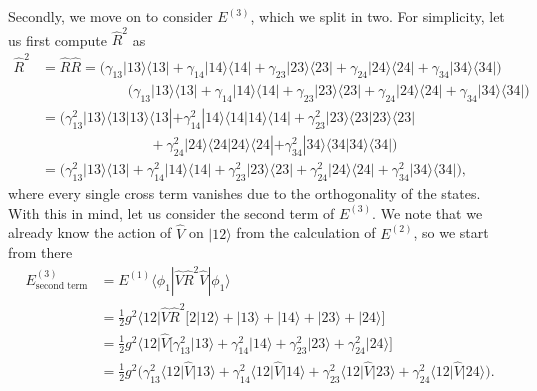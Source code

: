 \documentclass[a4paper]{article}
\newcommand{\nn}{\nonumber}
\begin{document}
Secondly, we move on to consider $E^{(3)}$, which we split in two. For simplicity, let us first compute $\hat R^2$ as
\begin{align}
\hat R^2 &= \hat R \hat R = \Big( \gamma_{13} |13\rangle\langle 13| + \gamma_{14} |14\rangle\langle 14| + \gamma_{23} |23\rangle\langle 23| + \gamma_{24} |24\rangle\langle 24| + \gamma_{34} |34\rangle\langle 34|  \Big) \nn\\
& \ \ \ \ \ \ \ \ \ \ \ \ \ \ \ \ \ \ \ \ \ \ \ \ \ \ \ \ \Big( \gamma_{13} |13\rangle\langle 13| + \gamma_{14} |14\rangle\langle 14| + \gamma_{23} |23\rangle\langle 23| + \gamma_{24} |24\rangle\langle 24| + \gamma_{34} |34\rangle\langle 34|  \Big) \nn\\
%
&= \Big( \gamma_{13}^2 |13\rangle\langle 13|13\rangle\langle 13| + \gamma_{14}^2 |14\rangle\langle 14|14\rangle\langle 14| + \gamma_{23}^2 |23\rangle\langle 23|23\rangle\langle 23| \nn\\
& \ \ \ \ \ \ \ \ \ \ \ \ \ \ \ \ \ \ \ \ \  \ \ \ \ \ \ \ \ \ \ \ \ \ \ +  \gamma_{24}^2 |24\rangle\langle 24|24\rangle\langle 24| + \gamma_{34}^2 |34\rangle\langle 34|34\rangle\langle 34|  \Big) \nn\\
%
&= \Big( \gamma_{13}^2 |13\rangle\langle 13| + \gamma_{14}^2 |14\rangle\langle 14| + \gamma_{23}^2 |23\rangle\langle 23| + \gamma_{24}^2 |24\rangle\langle 24| + \gamma_{34}^2 |34\rangle\langle 34|  \Big),
\end{align}
where every single cross term vanishes due to the orthogonality of the states. With this in mind, let us consider the second term of $E^{(3)}$. We note that we already know the action of $\hat V$ on $|12\rangle$ from the calculation of $E^{(2)}$, so we start from there
\begin{align}
E^{(3)}_\text{second term} &= E^{(1)}\langle \phi_1 |\hat V \hat R^2 \hat V |\phi_1\rangle \nn\\
%
&= \frac{1}{2}g^2 \Big\langle 12 \Big| \hat V \hat R^2 \Bigg[ 2\Big|12\Big\rangle +  \Big|13\Big\rangle + \Big|14\Big\rangle + \Big|23\Big\rangle + \Big|24\Big\rangle\Bigg] \nn\\
%
&= \frac{1}{2}g^2 \Big\langle 12 \Big| \hat V \Bigg[  \gamma_{13}^2\Big|13\Big\rangle + \gamma_{14}^2\Big|14\Big\rangle + \gamma_{23}^2\Big|23\Big\rangle + \gamma_{24}^2\Big|24\Big\rangle\Bigg] \nn\\
%
&= \frac{1}{2}g^2 \Big(  \gamma_{13}^2\big\langle12\big|\hat V\big|13\big\rangle + \gamma_{14}^2\big\langle12\big|\hat V\big|14\big\rangle + \gamma_{23}^2\big\langle12\big|\hat V\big|23\big\rangle + \gamma_{24}^2\big\langle12\big|\hat V\big|24\big\rangle \Big).
\end{align}
\end{document}
